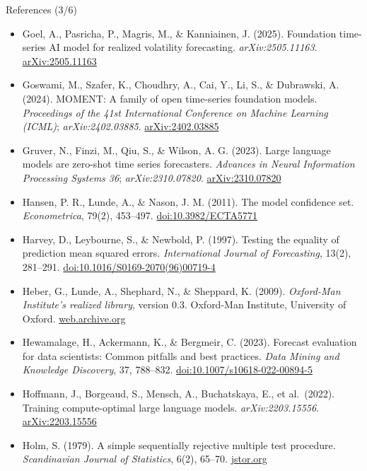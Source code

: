 \begin{frame}{References (3/6)}
\itemsize{\tiny}
\begin{itemize}
    \item Goel, A., Pasricha, P., Magris, M., \& Kanniainen, J. (2025). Foundation time-series AI model for realized volatility forecasting. \textit{arXiv:2505.11163}. \href{https://arxiv.org/abs/2505.11163}{arXiv:2505.11163}
    \item Goswami, M., Szafer, K., Choudhry, A., Cai, Y., Li, S., \& Dubrawski, A. (2024). MOMENT: A family of open time-series foundation models. \textit{Proceedings of the 41st International Conference on Machine Learning (ICML)}; \textit{arXiv:2402.03885}. \href{https://arxiv.org/abs/2402.03885}{arXiv:2402.03885}
    \item Gruver, N., Finzi, M., Qiu, S., \& Wilson, A. G. (2023). Large language models are zero-shot time series forecasters. \textit{Advances in Neural Information Processing Systems 36}; \textit{arXiv:2310.07820}. \href{https://arxiv.org/abs/2310.07820}{arXiv:2310.07820}
    \item Hansen, P. R., Lunde, A., \& Nason, J. M. (2011). The model confidence set. \textit{Econometrica}, 79(2), 453--497. \href{https://doi.org/10.3982/ECTA5771}{doi:10.3982/ECTA5771}
    \item Harvey, D., Leybourne, S., \& Newbold, P. (1997). Testing the equality of prediction mean squared errors. \textit{International Journal of Forecasting}, 13(2), 281--291. \href{https://doi.org/10.1016/S0169-2070(96)00719-4}{doi:10.1016/S0169-2070(96)00719-4}
    \item Heber, G., Lunde, A., Shephard, N., \& Sheppard, K. (2009). \textit{Oxford-Man Institute's realized library}, version 0.3. Oxford-Man Institute, University of Oxford. \href{https://web.archive.org/web/20220301022212/https://realized.oxford-man.ox.ac.uk/}{web.archive.org}
    \item Hewamalage, H., Ackermann, K., \& Bergmeir, C. (2023). Forecast evaluation for data scientists: Common pitfalls and best practices. \textit{Data Mining and Knowledge Discovery}, 37, 788--832. \href{https://doi.org/10.1007/s10618-022-00894-5}{doi:10.1007/s10618-022-00894-5}
    \item Hoffmann, J., Borgeaud, S., Mensch, A., Buchatskaya, E., et al.\ (2022). Training compute-optimal large language models. \textit{arXiv:2203.15556}. \href{https://arxiv.org/abs/2203.15556}{arXiv:2203.15556}
    \item Holm, S. (1979). A simple sequentially rejective multiple test procedure. \textit{Scandinavian Journal of Statistics}, 6(2), 65--70. \href{https://www.jstor.org/stable/4615733}{jstor.org}

\end{itemize}
\end{frame}
